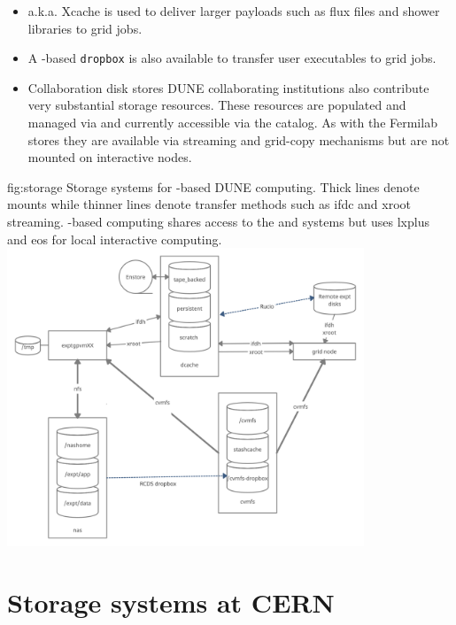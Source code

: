 \documentclass[../main-v1.tex]{subfiles}
\begin{document}
\begin{description}
\begin{itemize}
    \item {} a.k.a. Xcache is used to deliver larger payloads such as flux files and shower libraries to grid jobs.
    
    \item A -based  {\tt dropbox} is also available to transfer user executables to grid jobs. 
    
    



\item{Collaboration disk stores}
DUNE collaborating institutions also contribute very substantial storage resources. These resources are populated and managed via  and currently accessible via the  catalog. As with the Fermilab  stores they are available via streaming and grid-copy mechanisms but are not mounted on interactive nodes. 
 \end{itemize}


\end{description}
\begin{dunefigure}
{fig:storage}
{Storage systems for -based DUNE computing.  Thick lines denote mounts while thinner lines denote transfer methods such as ifdc and xroot streaming. -based computing shares access to the  and  systems but uses lxplus and eos for local interactive computing.}
\includegraphics[width=0.8\textwidth]{graphics/DataManagement/StorageMap3.png}
\end{dunefigure}

\section{Storage systems at CERN}
\end{document}
